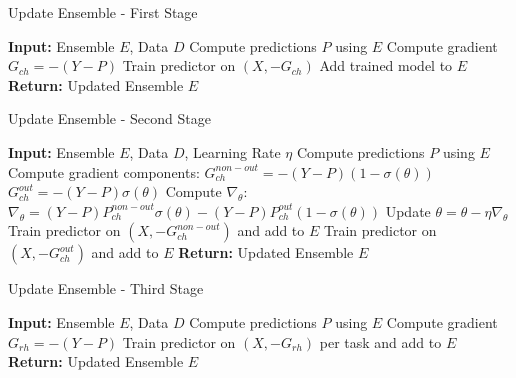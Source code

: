 \documentclass{article}
\begin{document}
\begin{algorithm}
    \caption{Update Ensemble - First Stage}
    \begin{algorithmic}[1]
        \STATE \textbf{Input:} Ensemble $E$, Data $D$
        \STATE Compute predictions $P$ using $E$
        \STATE Compute gradient $G_{ch} = -(Y - P)$
        \STATE Train predictor on $(X, -G_{ch})$ 
        \STATE Add trained model to $E$
        \STATE \textbf{Return:} Updated Ensemble $E$
    \end{algorithmic}
\end{algorithm}

\begin{algorithm}
    \caption{Update Ensemble - Second Stage}
    \begin{algorithmic}[1]
        \STATE \textbf{Input:} Ensemble $E$, Data $D$, Learning Rate $\eta$
        \STATE Compute predictions $P$ using $E$
        \STATE Compute gradient components:
        \STATE \quad $G_{ch}^{non-out} = -(Y - P) (1 - \sigma(\theta))$
        \STATE \quad $G_{ch}^{out} = -(Y - P) \sigma(\theta)$
        \STATE Compute $\nabla_{\theta}$:
        \STATE \quad $\nabla_{\theta} = (Y - P) P_{ch}^{non-out} \sigma(\theta) - (Y - P) P_{ch}^{out} (1 - \sigma(\theta))$
        \STATE Update $\theta = \theta - \eta \nabla_{\theta}$
        \STATE Train predictor on $(X, -G_{ch}^{non-out})$ and add to $E$
        \STATE Train predictor on $(X, -G_{ch}^{out})$ and add to $E$
        \STATE \textbf{Return:} Updated Ensemble $E$
    \end{algorithmic}
\end{algorithm}

\begin{algorithm}
    \caption{Update Ensemble - Third Stage}
    \begin{algorithmic}[1]
        \STATE \textbf{Input:} Ensemble $E$, Data $D$
        \STATE Compute predictions $P$ using $E$
        \STATE Compute gradient $G_{rh} = -(Y - P)$
        \STATE Train predictor on $(X, -G_{rh})$ per task and add to $E$
        \STATE \textbf{Return:} Updated Ensemble $E$
    \end{algorithmic}
\end{algorithm}
\end{document}
